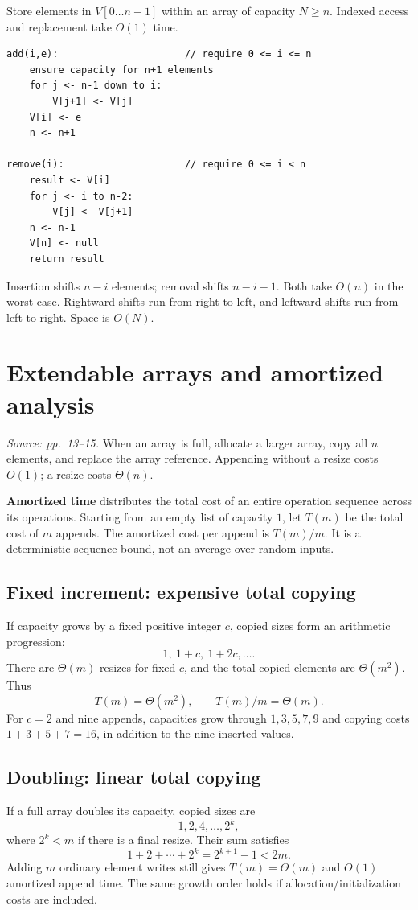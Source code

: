 \documentclass[11pt]{article}
\begin{document}
Store elements in $V[0\ldots n-1]$ within an array of capacity $N\ge n$. Indexed access and replacement take $O(1)$ time.
\begin{lstlisting}
add(i,e):                      // require 0 <= i <= n
    ensure capacity for n+1 elements
    for j <- n-1 down to i:
        V[j+1] <- V[j]
    V[i] <- e
    n <- n+1

remove(i):                     // require 0 <= i < n
    result <- V[i]
    for j <- i to n-2:
        V[j] <- V[j+1]
    n <- n-1
    V[n] <- null
    return result
\end{lstlisting}
Insertion shifts $n-i$ elements; removal shifts $n-i-1$. Both take $O(n)$ in the worst case. Rightward shifts run from right to left, and leftward shifts run from left to right. Space is $O(N)$.

\section{Extendable arrays and amortized analysis}
\textit{Source: pp.\ 13--15.}
When an array is full, allocate a larger array, copy all $n$ elements, and replace the array reference. Appending without a resize costs $O(1)$; a resize costs $\Theta(n)$.

\textbf{Amortized time} distributes the total cost of an entire operation sequence across its operations. Starting from an empty list of capacity $1$, let $T(m)$ be the total cost of $m$ appends. The amortized cost per append is $T(m)/m$. It is a deterministic sequence bound, not an average over random inputs.

\subsection{Fixed increment: expensive total copying}
If capacity grows by a fixed positive integer $c$, copied sizes form an arithmetic progression:
\[
1,\ 1+c,\ 1+2c,\ldots.
\]
There are $\Theta(m)$ resizes for fixed $c$, and the total copied elements are $\Theta(m^2)$. Thus
\[
T(m)=\Theta(m^2),\qquad T(m)/m=\Theta(m).
\]
For $c=2$ and nine appends, capacities grow through $1,3,5,7,9$ and copying costs $1+3+5+7=16$, in addition to the nine inserted values.

\subsection{Doubling: linear total copying}
If a full array doubles its capacity, copied sizes are
\[
1,2,4,\ldots,2^k,
\]
where $2^k<m$ if there is a final resize. Their sum satisfies
\[
1+2+\cdots+2^k=2^{k+1}-1<2m.
\]
Adding $m$ ordinary element writes still gives $T(m)=\Theta(m)$ and $O(1)$ amortized append time. The same growth order holds if allocation/initialization costs are included.
\end{document}
